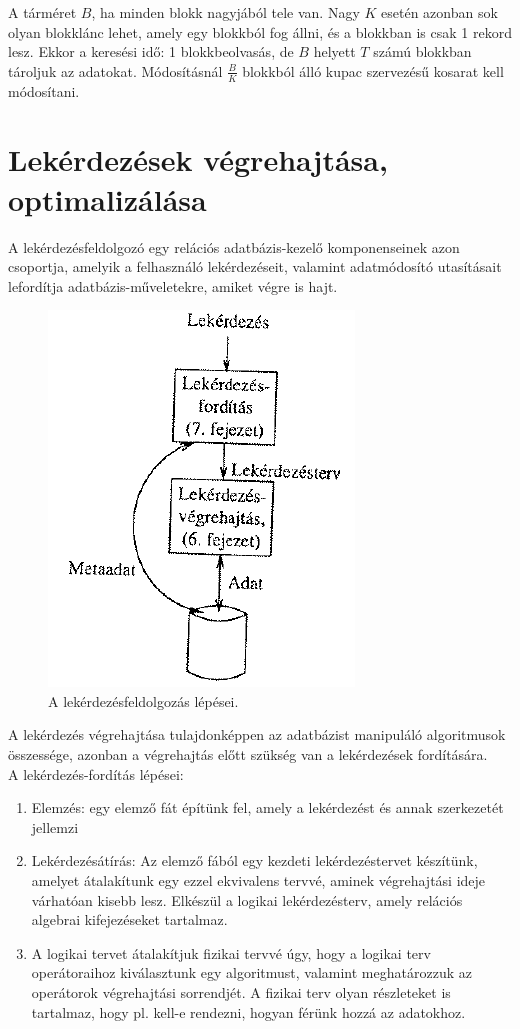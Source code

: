 \documentclass[margin=0px]{article}
\begin{document}
A tárméret $B$, ha minden blokk nagyjából tele van. Nagy $K$ esetén azonban sok olyan blokklánc lehet,
amely egy blokkból fog állni, és a blokkban is csak 1 rekord lesz. Ekkor a keresési idő: 1 blokkbeolvasás,
de $B$ helyett $T$ számú blokkban tároljuk az adatokat. Módosításnál $\frac{B}{K}$ blokkból álló kupac
szervezésű kosarat kell módosítani.

\section{Lekérdezések végrehajtása, optimalizálása}

A lekérdezésfeldolgozó egy relációs adatbázis-kezelő komponenseinek azon csoportja, amelyik a felhasználó lekérdezéseit,
valamint adatmódosító utasításait lefordítja adatbázis-műveletekre, amiket végre is hajt.

\begin{figure}[H]
    \centering
    \includegraphics[width=0.3\linewidth]{img/queryprocessing}
    \caption{A lekérdezésfeldolgozás lépései.}
    \label{fig:queryprocessing}
\end{figure}

A lekérdezés végrehajtása tulajdonképpen az adatbázist manipuláló algoritmusok összessége, azonban a végrehajtás
előtt szükség van a lekérdezések fordítására. \\

\noindent A lekérdezés-fordítás lépései:
\begin{enumerate}
    \item	Elemzés: egy elemző fát építünk fel, amely a lekérdezést és annak szerkezetét jellemzi

    \item	Lekérdezésátírás: Az elemző fából egy kezdeti lekérdezéstervet készítünk, amelyet átalakítunk
          egy ezzel ekvivalens tervvé, aminek végrehajtási ideje várhatóan kisebb lesz. Elkészül a logikai
          lekérdezésterv, amely relációs algebrai kifejezéseket tartalmaz.

    \item	A logikai tervet átalakítjuk fizikai tervvé úgy, hogy a logikai terv operátoraihoz kiválasztunk egy
          algoritmust,  valamint meghatározzuk az operátorok végrehajtási sorrendjét. A fizikai terv olyan részleteket is
          tartalmaz, hogy pl. kell-e rendezni, hogyan férünk hozzá az adatokhoz.
\end{enumerate}
\end{document}
